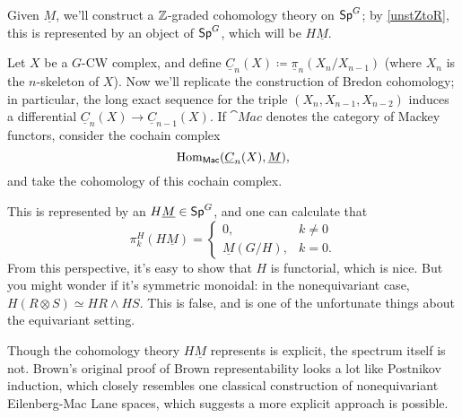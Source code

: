 \begin{cons}
Given $\underline M$, we'll construct a $\mathbb Z$-graded cohomology theory on $\mathsf{Sp}^G$; by \cref{unstZtoR}, this is
represented by an object of $\mathsf{Sp}^G$, which will be $H\underline M$.

Let $X$ be a $G$-CW complex, and define $\underline C_n(X)\coloneqq \underline\pi_n(X_n/X_{n-1})$ (where $X_n$ is
the $n$-skeleton of $X$). Now we'll replicate the construction of Bredon cohomology; in particular, the long exact
sequence for the triple $(X_n, X_{n-1}, X_{n-2})$ induces a differential $\underline C_n(X)\to\underline
C_{n-1}(X)$. If $\cat{Mac}$ denotes the category of Mackey functors, consider the cochain complex
\[\operatorname{Hom}_{\mathsf{Mac}}(\underline C_n(X), \underline M),\]
and take the cohomology of this cochain complex.

This is represented by an  $H\underline M\in\mathsf{Sp}^G$, and one can calculate that
\[\pi_k^H(H\underline M) = \begin{cases}
	0, &k\ne 0\\
	\underline M(G/H), &k = 0.
\end{cases}\]
From this perspective, it's easy to show that $H$ is functorial, which is nice. But you might wonder if it's
symmetric monoidal: in the nonequivariant case, $H(R\otimes S)\simeq HR\wedge HS$. This is false, and is one of
the unfortunate things about the equivariant setting.
\end{cons}
Though the cohomology theory $H\underline M$ represents is explicit, the spectrum itself is not. Brown's original
proof of Brown representability \cite{Brown} looks a lot like Postnikov induction, which closely resembles one
classical construction of nonequivariant Eilenberg-Mac Lane spaces, which suggests a more explicit approach is
possible.
